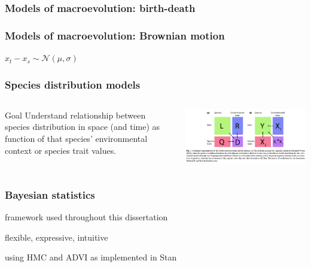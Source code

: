 \documentclass{beamer}
\begin{document}
\begin{frame}
  \frametitle{Models of macroevolution: birth-death}
\end{frame}

\begin{frame}
  \frametitle{Models of macroevolution: Brownian motion}

  \(x_{t} - x_{s} \sim \mathcal{N}(\mu, \sigma)\)
\end{frame}


\begin{frame}
  \frametitle{Species distribution models}

  \begin{columns}
    \begin{column}{0.5\textwidth}
      \begin{block}{Goal}
        Understand relationship between species distribution in space (and time) as function of that species' environmental context or species trait values.
      \end{block}
    \end{column}
    \begin{column}{0.5\textwidth}
      \includegraphics[width = \textwidth,height = 0.8\textheight,keepaspectratio = true]{figure/brown_fourth_corner}

      \footnotesize{}
    \end{column}
  \end{columns}
\end{frame}


\begin{frame}
  \frametitle{Bayesian statistics}

  framework used throughout this dissertation

  flexible, expressive, intuitive

  using HMC and ADVI as implemented in Stan 
\end{frame}
\end{document}
